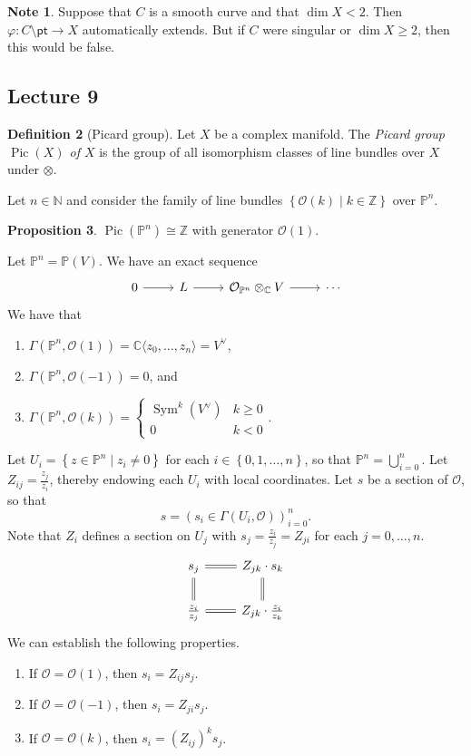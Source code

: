 \documentclass[10pt,letterpaper,cm]{nupset}
\theoremstyle{definition}
\newtheorem{defn}{Definition}[subsection]
\newtheorem{note}[defn]{Note}
\theoremstyle{theorem}
\newtheorem{prop}[defn]{Proposition}
\theoremstyle{remark}
\newcommand{\C}{\mathbb C}
\newcommand{\N}{\mathbb N}
\renewcommand{\O}{\mathcal O}
\renewcommand{\P}{\mathbb P}
\newcommand{\Z}{\mathbb Z}
\newcommand{\1}{\mathbb{1}}
\newcommand{\0}{\vec 0}
\newcommand{\pt}{\mathsf{pt}}
\DeclareMathOperator{\pic}{Pic}
\DeclareMathOperator{\sym}{Sym}
\newcommand{\be}{\begin{enumerate}}
\newcommand{\ee}{\end{enumerate}}
\begin{document}
\begin{note}
Suppose that $C$ is a smooth curve and that $\dim{X} < 2$. Then $\varphi : C \setminus \pt \to X$ automatically extends.  But if $C$ were singular or $\dim{X} \geq 2$, then this would be false.
\end{note}

\subsection{Lecture 9}

\begin{defn}[Picard group]
Let $X$ be a complex manifold. The \textit{Picard group $\pic(X)$ of $X$} is the group of all isomorphism classes of line bundles over $X$ under $\otimes$.
\end{defn}

Let $n\in \N$ and consider the family of line bundles $\left\{\O(k) \mid k \in \Z\right\}$ over $\P^n$.

\begin{prop}
$\pic\left(\P^n\right) \cong \Z$ with generator $\O(1)$. 
\end{prop}

Let $\P^n = \P(V)$. We have an exact sequence
\[
\begin{tikzcd}
0 \arrow[r] & L \arrow[r] & \O_{\P^n}\otimes_{\C} V \arrow[r] & \cdots
\end{tikzcd}
\]
We have that
\be
\item $\Gamma\left(\P^n , \O(1)\right) = \C\langle z_0, \ldots, z_n\rangle = V^{\vee}$,
\item $\Gamma \left(\P^n, \O({-1})\right) =0$, and
\item $\Gamma \left(\P^n, \O(k)\right) = \begin{cases} \sym^k\left(V^{\vee}\right) & k\geq0 \\ 0 & k<0\end{cases}$.
\ee

Let $U_i = \left\{z \in \P^n \mid z_i \ne 0\right\}$ for each $i\in \left\{0, 1, \ldots, n\right\}$, so that $\P^n = \bigcup_{i=0}^n$. Let $Z_{ij} = \frac{z_j}{z_i}$, thereby endowing each $U_i$ with local coordinates. Let $s$ be a section of $\O$, so that $$s = \left(s_i \in \Gamma\left(U_i, \O\right)\right)_{i=0}^n.$$ Note that $Z_i$ defines a section on $U_j$ with $s_j = \frac{z_i}{z_j} = Z_{ji}$ for each $j=0, \ldots, n$. 
\[
\begin{tikzcd}
s_j \arrow[r, equals] \arrow[d, equals]   & Z_{jk}\cdot s_k \arrow[d, equals]  \\
\frac{z_i}{z_j} \arrow[r, equals] & Z_{jk}\cdot\frac{z_i}{z_k}
\end{tikzcd}
\]
We can establish the following properties.
\be
\item If $\O= \O(1)$, then $s_i = Z_{ij}s_j$.
\item If $\O = \O({-1})$, then $s_i = Z_{ji}s_j$.
\item If $\O = \O(k)$, then $s_i = \left(Z_{ij}\right)^ks_j$.
\ee
\end{document}
